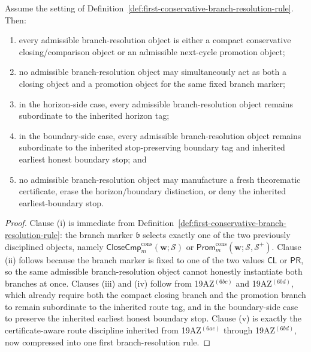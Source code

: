 \begin{proposition}
\label{prop:every-conservative-return-object-admits-exactly-one-honest-branch-choice-at-a-time-close-or-promote}
Assume the setting of Definition~\ref{def:first-conservative-branch-resolution-rule}. Then:
\begin{enumerate}[label=(\roman*)]
  \item every admissible branch-resolution object is either a compact conservative closing/comparison object or an admissible next-cycle promotion object;
  \item no admissible branch-resolution object may simultaneously act as both a closing object and a promotion object for the same fixed branch marker;
  \item in the horizon-side case, every admissible branch-resolution object remains subordinate to the inherited horizon tag;
  \item in the boundary-side case, every admissible branch-resolution object remains subordinate to the inherited stop-preserving boundary tag and inherited earliest honest boundary stop; and
  \item no admissible branch-resolution object may manufacture a fresh theorematic certificate, erase the horizon/boundary distinction, or deny the inherited earliest-boundary stop.
\end{enumerate}
\end{proposition}

\begin{proof}
Clause (i) is immediate from Definition~\ref{def:first-conservative-branch-resolution-rule}: the branch marker \(\mathfrak b\) selects exactly one of the two previously disciplined objects, namely \(\mathsf{CloseCmp}^{\mathrm{cons}}_{m}(\mathbf w;\mathcal S)\) or \(\mathsf{Prom}^{\mathrm{cons}}_{m}(\mathbf w;\mathcal S,\mathcal S^{+})\). Clause (ii) follows because the branch marker is fixed to one of the two values \(\mathsf{CL}\) or \(\mathsf{PR}\), so the same admissible branch-resolution object cannot honestly instantiate both branches at once. Clauses (iii) and (iv) follow from 19AZ$^{(6bc)}$ and 19AZ$^{(6bd)}$, which already require both the compact closing branch and the promotion branch to remain subordinate to the inherited route tag, and in the boundary-side case to preserve the inherited earliest honest boundary stop. Clause (v) is exactly the certificate-aware route discipline inherited from 19AZ$^{(6ae)}$ through 19AZ$^{(6bd)}$, now compressed into one first branch-resolution rule.
\end{proof}

